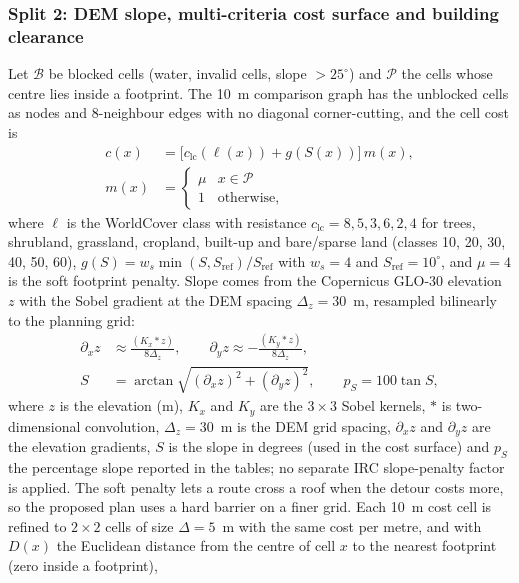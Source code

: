 \documentclass[10pt,a4paper,twocolumn]{article}
\begin{document}
\subsubsection{Split 2: DEM slope, multi-criteria cost surface and building clearance}\label{sec:cost}
Let $\mathcal B$ be blocked cells (water, invalid cells, slope $>25^{\circ}$) and $\mathcal P$ the cells whose centre lies inside a footprint. The 10~m comparison graph has the unblocked cells as nodes and 8-neighbour edges with no diagonal corner-cutting, and the cell cost is
\begin{equation}
\begin{aligned}
c(x)&=\bigl[c_{\mathrm{lc}}(\ell(x))+g(S(x))\bigr]\,m(x),\\
m(x)&=\begin{cases}\mu & x\in\mathcal P\\ 1 & \text{otherwise,}\end{cases}
\end{aligned}
\label{eq:cell}
\end{equation}
where $\ell$ is the WorldCover class with resistance $c_{\mathrm{lc}}=8,5,3,6,2,4$ for trees, shrubland, grassland, cropland, built-up and bare/sparse land (classes 10, 20, 30, 40, 50, 60), $g(S)=w_s\min(S,S_{\mathrm{ref}})/S_{\mathrm{ref}}$ with $w_s=4$ and $S_{\mathrm{ref}}=10^{\circ}$, and $\mu=4$ is the soft footprint penalty. Slope comes from the Copernicus GLO-30 elevation $z$ with the Sobel gradient \cite{sobel1968gradient,horn1981hill} at the DEM spacing $\Delta_z=30$~m, resampled bilinearly to the planning grid:
\begin{equation}
\begin{aligned}
\partial_x z&\approx\frac{(K_x{*}z)}{8\Delta_z},\qquad \partial_y z\approx-\frac{(K_y{*}z)}{8\Delta_z},\\
S&=\arctan\sqrt{(\partial_x z)^2+(\partial_y z)^2},\qquad p_S=100\tan S,
\end{aligned}
\label{eq:slope}
\end{equation}
where $z$ is the elevation (m), $K_x$ and $K_y$ are the $3\times3$ Sobel kernels, $*$ is two-dimensional convolution, $\Delta_z=30$~m is the DEM grid spacing, $\partial_x z$ and $\partial_y z$ are the elevation gradients, $S$ is the slope in degrees (used in the cost surface) and $p_S$ the percentage slope reported in the tables; no separate IRC slope-penalty factor is applied. The soft penalty lets a route cross a roof when the detour costs more, so the proposed plan uses a hard barrier on a finer grid. Each 10~m cost cell is refined to $2\times2$ cells of size $\Delta=5$~m with the same cost per metre, and with $D(x)$ the Euclidean distance from the centre of cell $x$ to the nearest footprint (zero inside a footprint),
\end{document}
